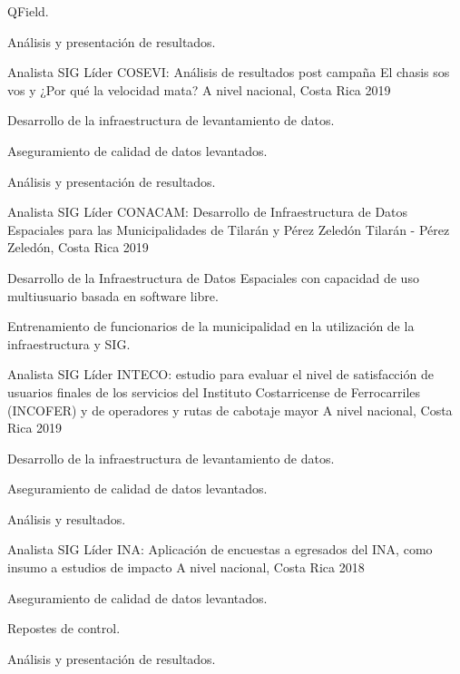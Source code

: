 \begin{cventries}
{\begin{cvitems}
    QField.
    \item Análisis y presentación de resultados.
  \end{cvitems}
}
\cventry
{Analista SIG Líder} %
{COSEVI: Análisis de resultados post campaña El chasis sos vos y ¿Por qué
  la velocidad mata?} %
{A nivel nacional, Costa Rica} %
{2019} %
{
  \begin{cvitems} %
    \item Desarrollo de la infraestructura de levantamiento de datos.
    \item Aseguramiento de calidad de datos levantados.
    \item Análisis y presentación de resultados.
  \end{cvitems}
}
\cventry
{Analista SIG Líder} %
{CONACAM: Desarrollo de Infraestructura de Datos Espaciales para las
  Municipalidades de Tilarán y Pérez Zeledón} %
{Tilarán - Pérez Zeledón, Costa Rica} %
{2019} %
{
  \begin{cvitems} %
    \item Desarrollo de la Infraestructura de Datos Espaciales con capacidad de
    uso multiusuario basada en software libre.
    \item Entrenamiento de funcionarios de la municipalidad en la utilización
    de la infraestructura y SIG.
  \end{cvitems}
}
\cventry
{Analista SIG Líder} %
{INTECO: estudio para evaluar el
  nivel de satisfacción de usuarios finales de los servicios del Instituto
  Costarricense de Ferrocarriles (INCOFER) y de operadores y rutas de cabotaje
  mayor} %
{A nivel nacional, Costa Rica} %
{2019} %
{
  \begin{cvitems} %
    \item Desarrollo de la infraestructura de levantamiento de datos.
    \item Aseguramiento de calidad de datos levantados.
    \item Análisis y resultados.
  \end{cvitems}
}
\cventry
{Analista SIG Líder} %
{INA: Aplicación de encuestas a egresados del INA, como insumo a estudios de
  impacto} %
{A nivel nacional, Costa Rica} %
{2018} %
{
  \begin{cvitems} %
    \item Aseguramiento de calidad de datos levantados.
    \item Repostes de control.
    \item Análisis y presentación de resultados.
  \end{cvitems}
}


\end{cventries}
